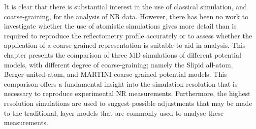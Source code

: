 It is clear that there is substantial interest in the use of classical simulation, and coarse-graining, for the analysis of NR data.
However, there has been no work to investigate whether the use of atomistic simulations gives more detail than is required to reproduce the reflectometry profile accurately or to assess whether the application of a coarse-grained representation is suitable to aid in analysis.
This chapter presents the comparison of three MD simulations of different potential models, with different degree of coarse-graining; namely the Slipid all-atom,\autocite{jambeck_derivation_2012} Berger united-atom,\autocite{berger_molecular_1997} and MARTINI coarse-grained potential models.\cite{marrink_martini_2007}
This comparison offers a fundamental insight into the simulation resolution that is necessary to reproduce experimental NR measurements.
Furthermore, the highest resolution simulations are used to suggest possible adjustments that may be made to the traditional, layer models that are commonly used to analyse these measurements.
